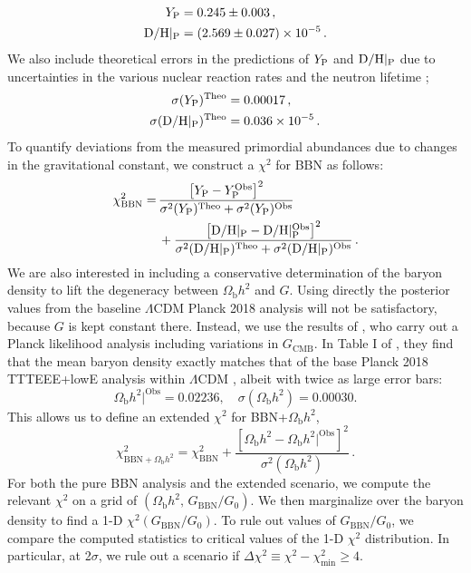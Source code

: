 \documentclass[notitlepage,twocolumn,letterpaper,natbib,aps,prl,amsmath,amsfonts,nofootinbib,preprintnumbers,superscriptaddress,secnumarabic,groupedaddress]{revtex4-1}
\begin{document}
\vspace*{-0.55 cm}
\begin{align}
Y_{\rm P} 	            &= 0.245 \pm 0.003 \label{eq:Yp}\, , \\
{\rm D/H}|_{\rm P}   	&= (2.569  \pm 0.027) \times 10^{-5} \label{eq:DH} \,.
\end{align}
We also include theoretical errors in the predictions of $Y_{\rm P}$ and ${\rm D/H}|_{\rm P}$ due to uncertainties in the various nuclear reaction rates and the neutron lifetime \cite{Pitrou:2018cgg};
\begin{align}
\sigma(Y_{\rm P})^{\rm Theo} 	        		&= 0.00017 \,, \label{eq:sigmaYP} \\
\sigma({\rm D/H}|_{\rm P} )^{\rm Theo}   	&= 0.036 \times 10^{-5} \label{eq:sigmaDH} \, .
\end{align}
To quantify deviations from the measured primordial abundances due to changes in the gravitational constant, we construct a $\chi^2$ for BBN as follows:
\begin{align}\label{eq:chiBBN}
\chi_{\rm BBN}^2 =\, &\frac{\left[Y_{\rm P} - Y_{\rm P}^{\rm Obs}\right]^2}{\sigma^2(Y_{\rm P})^{\rm Theo} + \sigma^2(Y_{\rm P})^{\rm Obs}}\nonumber\\
&+ \frac{\left[{\rm D/H}|_{\rm P} - {\rm D/H}|_{\rm P}^{\rm Obs}\right]^2}{\sigma^2({\rm D/H}|_{\rm P} )^{\rm Theo} + \sigma^2({\rm D/H}|_{\rm P} )^{\rm Obs}} \, .
\end{align}
We are also interested in including a conservative determination of the baryon density to lift the degeneracy between $\Omega_{\mathrm{b}}h^2$ and $G$. Using directly the posterior values from the baseline $\Lambda$CDM Planck 2018 analysis will not be satisfactory, because $G$ is kept constant there. Instead, we use the results of \cite{Bai:2015vca}, who carry out a Planck likelihood analysis including variations in $G_{\mathrm{CMB}}$. In Table I of \cite{Bai:2015vca}, they find that the mean baryon density exactly matches that of the base Planck 2018 TTTEEE+lowE analysis within $\Lambda$CDM \cite{Aghanim:2018eyx}, albeit with twice as large error bars:
\begin{equation}
    \Omega_{\mathrm{b}}h^2|^{\mathrm{Obs}} = 0.02236, \quad \sigma(\Omega_{\mathrm{b}}h^2)= 0.00030.
\end{equation}
This allows us to define an extended $\chi^2$ for BBN+$\Omega_{\mathrm{b}}h^2$,
\begin{equation}
    \chi^2_{\mathrm{BBN}+\Omega_{\mathrm{b}}h^2} = \chi^2_{\mathrm{BBN}} + \frac{[\Omega_{\mathrm{b}}h^2 - \Omega_{\mathrm{b}}h^2|^{\mathrm{Obs}}]^2}{\sigma^2(\Omega_{\mathrm{b}}h^2)}\,.
\end{equation}
For both the pure BBN analysis and the extended scenario, we compute the relevant $\chi^2$ on a grid of $(\Omega_{\mathrm{b}} h^2,\,G_{\mathrm{BBN}}/G_0)$. We then marginalize over the baryon density to find a 1-D $\chi^2(G_{\mathrm{BBN}}/G_0)$. To rule out values of $G_{\mathrm{BBN}}/G_0$, we compare the computed statistics to critical values of the 1-D $\chi^2$ distribution. In particular, at 2$\sigma$, we rule out a scenario if $\Delta \chi^2 \equiv \chi^2 - \chi^2_\mathrm{min} \geq 4$.
\end{document}

